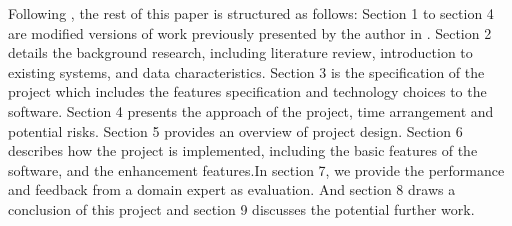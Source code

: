 Following \cite{Laramee2011}, the rest of this paper is structured as follows: Section 1 to section 4 are modified versions of work previously presented by the author in \cite{Liu}. Section 2 details the background research, including literature review, introduction to existing systems, and data characteristics. Section 3 is the specification of the project which includes the features specification and technology choices to the software. Section 4 presents the approach of the project, time arrangement and potential risks. Section 5 provides an overview of project design.  Section 6 describes how the project is implemented, including the basic features of the software, and the enhancement features.In section 7, we provide the performance and feedback from a domain expert as evaluation. And section 8 draws a conclusion of this project and section 9 discusses the potential further work. 



